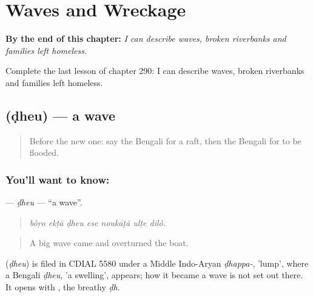 
\chapter{Waves and Wreckage}
\label{ch:bn-waves-and-wreckage}

\begin{chapteropening}
\textbf{By the end of this chapter:} \emph{I can describe waves, broken riverbanks and families left homeless.}

Complete the last lesson of chapter 290: I can describe waves, broken riverbanks and families left homeless.
\end{chapteropening}

\section[\texorpdfstring{\bn{ঢেউ} (ḍheu)}{ঢেউ (ḍheu)}]{ (ḍheu) — a wave}

\label{lesson:BN-C290-dheu}



\begin{quote}
Before the new one: say the Bengali for a raft, then the Bengali for to be flooded.
\end{quote}

\subsection*{You'll want to know: }
\textbf{} — \emph{ḍheu} — \textquotedblleft{}a wave\textquotedblright{}.

\begin{quote}
      
\end{quote}

\begin{quote}
\emph{bôṛo ekṭā ḍheu ese noukāṭā ulṭe dilô.}
\end{quote}

\begin{quote}
A big wave came and overturned the boat.
\end{quote}

\begin{cousinweb}
\textbf{} (\emph{ḍheu}) is filed in CDIAL 5580 under a Middle Indo-Aryan \emph{ḍhappa-}, 'lump', where a Bengali \emph{ḍheu}, 'a swelling', appears; how it became a wave is not set out there. It opens with , the breathy \emph{ḍh}.
\end{cousinweb}


